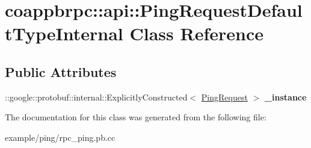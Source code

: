 \hypertarget{classcoappbrpc_1_1api_1_1PingRequestDefaultTypeInternal}{}\section{coappbrpc\+:\+:api\+:\+:Ping\+Request\+Default\+Type\+Internal Class Reference}
\label{classcoappbrpc_1_1api_1_1PingRequestDefaultTypeInternal}
\subsection*{Public Attributes}
\begin{DoxyCompactItemize}
\item 
\mbox{\label{classcoappbrpc_1_1api_1_1PingRequestDefaultTypeInternal_a82925acb3c15912541712cdf69bafb7f}} 
\+::google\+::protobuf\+::internal\+::\+Explicitly\+Constructed$<$ \hyperlink{classcoappbrpc_1_1api_1_1PingRequest}{Ping\+Request} $>$ {\bfseries \+\_\+instance}
\end{DoxyCompactItemize}


The documentation for this class was generated from the following file\+:\begin{DoxyCompactItemize}
\item 
example/ping/rpc\+\_\+ping.\+pb.\+cc\end{DoxyCompactItemize}
